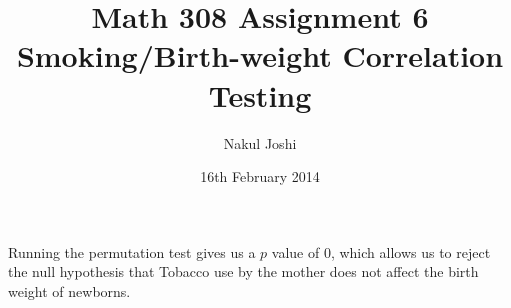 \documentclass{article}
\title{Math 308 Assignment 6\\Smoking/Birth-weight Correlation Testing}
\author{Nakul Joshi}
\date{16th February 2014}
\begin{document}
\maketitle
Running the permutation test gives us a $p$ value of $0$, which allows us to reject the null hypothesis that Tobacco use by the mother does not affect the birth weight of newborns.
\end{document}
